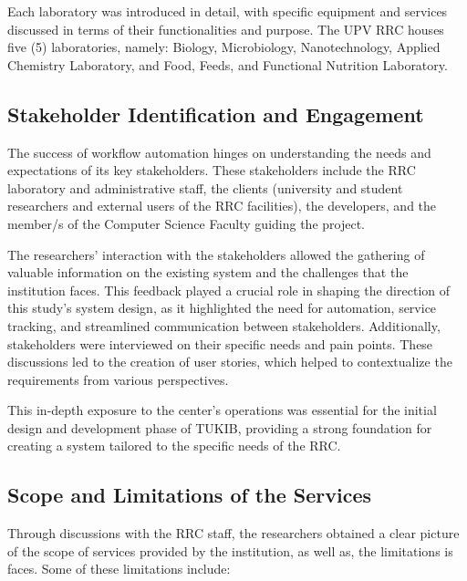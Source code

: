 Each laboratory was introduced in detail, with specific equipment and services discussed in terms of their functionalities and purpose. The UPV RRC houses five (5) laboratories, namely: Biology, Microbiology, Nanotechnology, Applied Chemistry Laboratory, and Food, Feeds, and Functional Nutrition Laboratory.

\subsection{Stakeholder Identification and Engagement}
The success of workflow automation hinges on understanding the needs and expectations of its key stakeholders. These stakeholders include the RRC laboratory and administrative staff, the clients (university and student researchers and external users of the RRC facilities), the developers, and the member/s of the Computer Science Faculty guiding the project.

The researchers' interaction with the stakeholders allowed the gathering of valuable information on the existing system and the challenges that the institution faces. This feedback played a crucial role in shaping the direction of this study's system design, as it highlighted the need for automation, service tracking, and streamlined communication between stakeholders. Additionally, stakeholders were interviewed on their specific needs and pain points. These discussions led to the creation of user stories, which helped to contextualize the requirements from various perspectives. 

This in-depth exposure to the center’s operations was essential for the initial design and development phase of TUKIB, providing a strong foundation for creating a system tailored to the specific needs of the RRC.

\subsection{Scope and Limitations of the Services}
Through discussions with the RRC staff, the researchers obtained a clear picture of the scope of services provided by the institution, as well as, the limitations is faces. Some of these limitations include:

